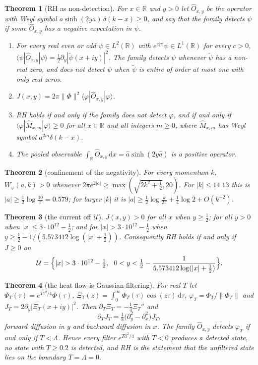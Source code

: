 \documentclass[11pt]{article}
\newtheorem{theorem}{Theorem}[section]
\theoremstyle{definition}\newtheorem{definition}[theorem]{Definition}
\theoremstyle{remark}\newtheorem{remark}[theorem]{Remark}
\newcommand{\R}{\mathbb R}\newcommand{\C}{\mathbb C}\newcommand{\N}{\mathbb N}
\newcommand{\dd}{\,\mathrm d}\newcommand{\e}{\mathrm e}
\begin{document}
\begin{theorem}[RH as non-detection]\label{mt:detect}
For $x\in\R$ and $y>0$ let $\hat O_{x,y}$ be the operator with Weyl symbol $a\sinh(2ya)\,\delta(k-x)\ge0$, and say that the family detects $\psi$ if some $\hat O_{x,y}$ has a negative expectation in $\psi$.
\begin{enumerate}[label=(\roman*)]
\item For every real even or odd $\psi\in L^2(\R)$ with $e^{c|\tau|}\psi\in L^1(\R)$ for every $c>0$, $\langle\psi|\hat O_{x,y}|\psi\rangle=\frac12\partial_y|\tilde\psi(x+iy)|^2$. The family detects $\psi$ whenever $\tilde\psi$ has a non-real zero, and does not detect $\psi$ when $\tilde\psi$ is entire of order at most one with only real zeros.
\item $J(x,y)=2\pi\|\Phi\|^2\langle\varphi|\hat O_{x,y}|\varphi\rangle$.
\item RH holds if and only if the family does not detect $\varphi$, and if and only if $\langle\varphi|\hat M_{x,m}|\varphi\rangle\ge0$ for all $x\in\R$ and all integers $m\ge0$, where $\hat M_{x,m}$ has Weyl symbol $a^{2m}\delta(k-x)$.
\item The pooled observable $\int_\R\hat O_{x,y}\dd x=\hat a\sinh(2y\hat a)$ is a positive operator.
\end{enumerate}
\end{theorem}

\begin{theorem}[confinement of the negativity]\label{mt:confine}
For every momentum $k$, $W_\varphi(a,k)>0$ whenever $2\pi e^{2|a|}\ge\max(\sqrt{2k^2+\frac12},20)$. For $|k|\le14.13$ this is $|a|\ge\frac12\log\frac{10}\pi=0.579$; for larger $|k|$ it is $|a|\ge\frac12\log\frac k{2\pi}+\frac14\log2+O(k^{-2})$.
\end{theorem}

\begin{theorem}[the current off $\mathcal U$]\label{mt:pos}
$J(x,y)>0$ for all $x$ when $y\ge\frac12$; for all $y>0$ when $|x|\le3\cdot10^{12}-\frac12$; and for $|x|>3\cdot10^{12}-\frac12$ when $y\ge\frac12-1/(5.573412\log(|x|+\frac12))$. Consequently RH holds if and only if $J\ge0$ on
\[
\mathcal U=\Bigl\{|x|>3\cdot10^{12}-\tfrac12,\ \ 0<y<\tfrac12-\frac1{5.573412\log(|x|+\frac12)}\Bigr\}.
\]
\end{theorem}

\begin{theorem}[the heat flow is Gaussian filtering]\label{mt:flow}
For real $T$ let $\Phi_T(\tau)=e^{T\tau^2/4}\Phi(\tau)$, $\Xi_T(z)=\int_0^\infty\Phi_T(\tau)\cos(z\tau)\dd\tau$, $\varphi_T=\Phi_T/\|\Phi_T\|$ and $J_T=2\partial_y|\Xi_T(x+iy)|^2$. Then $\partial_T\Xi_T=-\frac14\Xi_T''$ and
\[
\partial_TJ_T=\tfrac18\bigl(\partial_y^2-\partial_x^2\bigr)J_T ,
\]
forward diffusion in $y$ and backward diffusion in $x$. The family $\hat O_{x,y}$ detects $\varphi_T$ if and only if $T<\Lambda$. Hence every filter $e^{T\hat a^2/4}$ with $T<0$ produces a detected state, no state with $T\ge0.2$ is detected, and RH is the statement that the unfiltered state lies on the boundary $T=\Lambda=0$.
\end{theorem}
\end{document}
